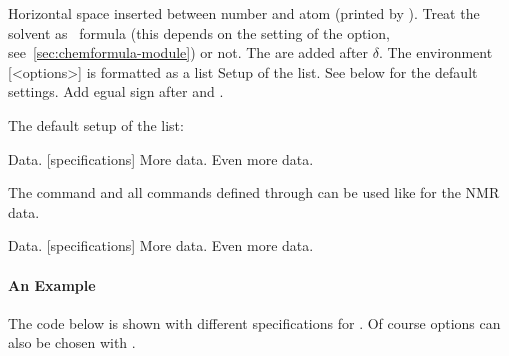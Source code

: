 \documentclass{chemmacros-manual}
\begin{document}
\begin{options}
  \Default{.16667em}
    Horizontal space inserted between number and atom
    (printed by \cs{\#}).
    Treat the solvent as \chemformula\ formula (this depends on the setting of
    the  option, see~\vref{sec:chemformula-module}) or not.
  \Default
    The  are added after $\delta$.
    The environment [<options>]{} is formatted as a list
    Setup of the list. See below for the default settings.
    Add egual sign after  and .
\end{options}

The default setup of the list:
\begin{sourcecode}
  \topsep\z@skip \partopsep\z@skip 
  \itemsep\z@ \parsep\z@ \itemindent\z@
  \leftmargin\z@
\end{sourcecode}

\begin{example}
  \begin{experimental}[format=\bfseries]
     Data.
    [specifications] More data.
     Even more data.
  \end{experimental}
\end{example}

The command  and all commands defined through 
can be used like  for the NMR data.

\begin{example}
  \begin{experimental}[format=\bfseries,use-equal]
     Data.
    [specifications] More data.
    \NMR Even more data.
  \end{experimental}
\end{example}

\paragraph{An Example}
The code below is shown with different specifications for .
Of course options can also be chosen with .
\end{document}
